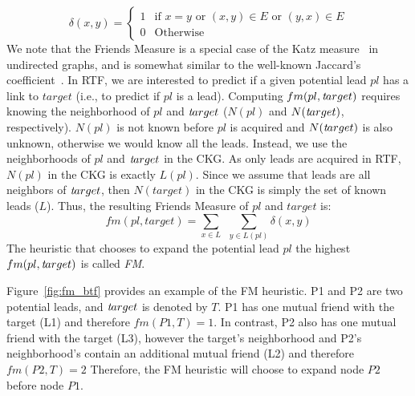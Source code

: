 \documentclass[journal]{IEEEtran}
\newcommand{\target}{{\textit target}}
\begin{document}
\begin{equation}
\delta(x,y) = \begin{cases}
1 &\text{if $x=y$ or $(x,y)\in E$ or $(y,x) \in E$}\\
0 &\text{Otherwise}
\end{cases}
\end{equation}
We note that the Friends Measure is a special case of the Katz measure~\cite{katz1953aNewStatus} in undirected graphs, and is somewhat similar to the well-known Jaccard's coefficient~\cite{fire2014computationallyEfficient}. 
In RTF, we are interested to predict if a given potential lead $pl$ has a link to $target$ (i.e., to predict if $pl$ is a lead). Computing $fm(pl,\target)$ requires knowing the neighborhood of $pl$ and $\target$ ($N(pl)$ and $N(\target)$, respectively). $N(pl)$ is not known before $pl$ is acquired and $N(\target)$ is also unknown, otherwise we would know all the leads. Instead, we use the neighborhoods of $pl$ and $\target$ in the CKG. As only leads are acquired in RTF, $N(pl)$ in the CKG is exactly $L(pl)$. Since we assume that leads are all neighbors of $\target$, then $N(target)$ in the CKG is simply the set of known leads ($L$). Thus, the resulting Friends Measure of $pl$ and $target$ is:
\begin{equation}
fm(pl,target)= \sum\limits_{x\in L}~~\sum\limits_{y\in L(pl)  } \delta(x,y)
\end{equation}
\noindent The heuristic that chooses to expand the potential lead $pl$ the highest $fm(pl,\target)$ is called {\em FM}. 




Figure~\ref{fig:fm_btf} provides an example of the FM heuristic. P1 and P2 are two potential leads, and $\target$ is denoted by $T$. P1 has one mutual friend with the target (L1) and therefore $fm(P1,T)=1$. In contrast, P2 also has one mutual friend with the target (L3), however the target's neighborhood and P2's neighborhood's contain an additional mutual friend (L2) and therefore $fm(P2,T)=2$
Therefore, the FM  heuristic will choose to expand node $P2$ before node $P1$.
\end{document}
